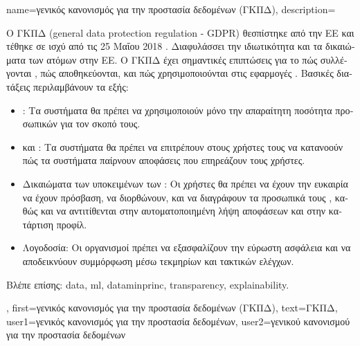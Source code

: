 {name={\foreignlanguage{greek}{γενικός κανονισμός για την προστασία δεδομένων (ΓΚΠΔ)}},
	description={\foreignlanguage{greek}{Ο ΓΚΠΔ} 
		(general data protection regulation - GDPR) \foreignlanguage{greek}{θεσπίστηκε από την ΕΕ και τέθηκε σε ισχύ από τις 25 Μαΐου 2018} \cite{GDPR2016}. 
		\foreignlanguage{greek}{Διαφυλάσσει την ιδιωτικότητα και τα δικαιώματα}  \foreignlanguage{greek}{των ατόμων στην  
		ΕΕ. Ο ΓΚΠΔ έχει σημαντικές επιπτώσεις για το πώς συλλέγονται} , \foreignlanguage{greek}{πώς 
		αποθηκεύονται, και πώς χρησιμοποιούνται στις εφαρμογές} . \foreignlanguage{greek}{Βασικές 
		διατάξεις περιλαμβάνουν τα εξής}:
		\begin{itemize}
			\item {}: \foreignlanguage{greek}{Τα συστήματα}  \foreignlanguage{greek}{θα πρέπει να 
			χρησιμοποιούν μόνο την απαραίτητη ποσότητα προσωπικών}  \foreignlanguage{greek}{για τον σκοπό τους.} 
			\item {} \foreignlanguage{greek}{και} : \foreignlanguage{greek}{Τα συστήματα} 
			 \foreignlanguage{greek}{θα πρέπει να επιτρέπουν στους χρήστες τους να κατανοούν πώς τα συστήματα παίρνουν 
			αποφάσεις που επηρεάζουν τους χρήστες.} 
			\item \foreignlanguage{greek}{Δικαιώματα των υποκειμένων των} : \foreignlanguage{greek}{Οι χρήστες θα πρέπει να 
			έχουν την ευκαιρία να έχουν πρόσβαση, να διορθώνουν, και να διαγράφουν τα προσωπικά τους} , 
			\foreignlanguage{greek}{καθώς και να αντιτίθενται στην αυτοματοποιημένη λήψη αποφάσεων και στην κατάρτιση προφίλ.} 
			\item \foreignlanguage{greek}{Λογοδοσία: Οι οργανισμοί πρέπει να εξασφαλίζουν την εύρωστη ασφάλεια}  
			\foreignlanguage{greek}{και να αποδεικνύουν συμμόρφωση μέσω τεκμηρίων και τακτικών ελέγχων.} 
		\end{itemize}
		\foreignlanguage{greek}{Βλέπε επίσης:} \gls{data}, \gls{ml}, \gls{dataminprinc}, \gls{transparency}, \gls{explainability}.}, 
	first={\foreignlanguage{greek}{γενικός κανονισμός για την προστασία δεδομένων (ΓΚΠΔ)}},
	text={\foreignlanguage{greek}{ΓΚΠΔ}},
	user1={\foreignlanguage{greek}{γενικός κανονισμός για την προστασία δεδομένων}}, %
    	user2={\foreignlanguage{greek}{γενικού κανονισμού για την προστασία δεδομένων}} %
}

